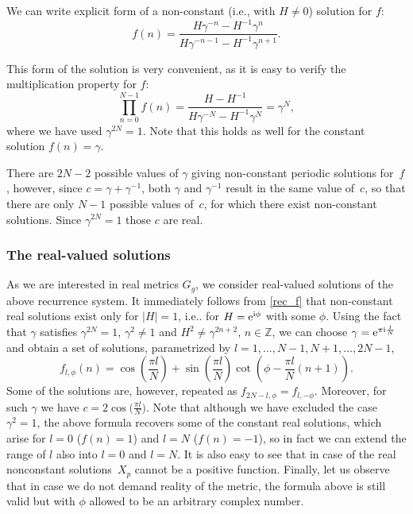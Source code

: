 \documentclass[10pt,a4paper]{amsart}
\numberwithin{equation}{section}
\begin{document}
We can write explicit form of a non-constant (i.e., with $H\neq 0$) solution for $f$:
\begin{equation}
f(n) = \frac{H \gamma^{-n} - H^{-1} \gamma^{n}}{H\gamma^{-n-1} - H^{-1}\gamma^{n+1}}.\label{rec_f}
\end{equation}

This form of the solution is very convenient, as it is easy to verify the multiplication property for $f$:
\begin{equation*}
\prod\limits_{n=0}^{N-1} f(n) = \frac{H-H^{-1}}{H\gamma^{-N}-H^{-1}\gamma^{N}}=\gamma^N,%
\end{equation*}
where we have used $\gamma^{2N}=1$. Note that this holds as well for the constant solution $f(n)=\gamma$.

There are $2N-2$ possible values of $\gamma$ giving non-constant periodic solutions for~$f$, however,
since $c=\gamma+\gamma^{-1}$, both $\gamma$ and $\gamma^{-1}$ result in the same value of~$c$, so that
there are only $N-1$ possible values of~$c$, for which there exist non-constant solutions.
Since $\gamma^{2N}=1$ those $c$ are real.

\subsubsection{The real-valued solutions}
As we are interested in real metrics $G_g$, we consider real-valued solutions of the above recurrence system. It immediately follows from \eqref{rec_f} that
non-constant real solutions exist only for \mbox{$|H|=1$}, i.e.. for $H={\rm e}^{{\rm i}\phi}$ with some $\phi$. Using the fact that $\gamma$ satisfies $\gamma^{2N}=1$, $\gamma^2\neq 1$
and $H^2\neq \gamma^{2n+2}$, $n\in\mathbb{Z}$, we can choose $\gamma = {\rm e}^{\pi {\rm i} \frac{l}{N}}$ and obtain a set of solutions, parametrized by $l=1,\dots ,N-1,\allowbreak N+1,\ldots, 2N-1$,
\begin{equation*}
f_{l,\phi}(n)=\cos\left(\frac{\pi l}{N}\right)+\sin\left(\frac{\pi l}{N}\right)\cot\left(\phi-\frac{\pi l}{N}(n+1)\right).
\end{equation*}
Some of the solutions are, however, repeated as $f_{2N-l,\phi}=f_{l,-\phi}$. Moreover, for such $\gamma$ we have
$c=2\cos\big(\frac{\pi l}{N}\big)$. Note that although we have excluded the case $\gamma^2=1$, the above formula recovers some of
the constant real solutions, which arise for
$l=0$ ($f(n)=1$) and $l=N$ ($f(n)=-1$), so in fact we can extend the range of $l$ also into $l=0$ and $l=N$. It is also easy to see that in case of the real nonconstant solutions~$X_p$ cannot be a positive
function. Finally, let us observe that in case we do not demand reality of the metric, the formula above is still valid but with $\phi$ allowed to be an arbitrary complex number.
\end{document}

